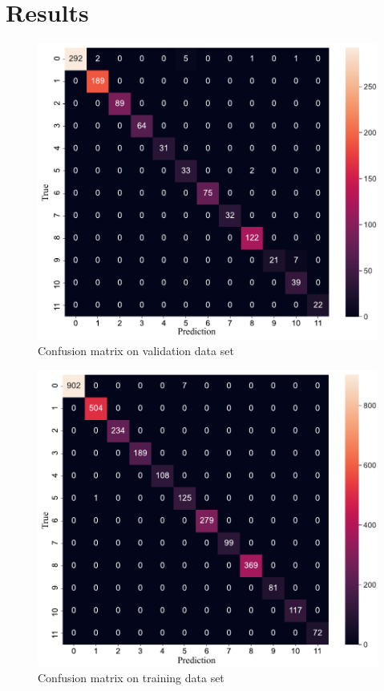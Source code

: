 \section{Results}
\label{sec:Results}
\begin{figure}[!ht]
    \centering
    \includegraphics[width=.85\textwidth]{evaluation/imgs/5-confusion_matrix_val.pdf}
    \caption{Confusion matrix on validation data set}
    \label{fig:5-confusion_matrix_val}
\end{figure}

\begin{figure}[!ht]
    \centering
    \includegraphics[width=.85\textwidth]{evaluation/imgs/5-confusion_matrix_train.pdf}
    \caption{Confusion matrix on training data set}
    \label{fig:5-confusion_matrix_train}
\end{figure}